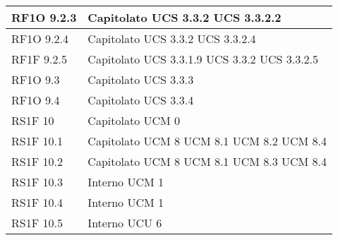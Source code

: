 \begin{center}
\begin{longtable}{ | p{5cm} | p{5cm} |}
        RF1O 9.2.3 &  Capitolato \newline  UCS 3.3.2 \newline  UCS 3.3.2.2 \newline  \\ \hline      
        RF1O 9.2.4 &  Capitolato \newline  UCS 3.3.2 \newline  UCS 3.3.2.4 \newline  \\ \hline      
        RF1F 9.2.5 &  Capitolato \newline  UCS 3.3.1.9 \newline  UCS 3.3.2 \newline  UCS 3.3.2.5 \newline  \\ \hline      
        RF1O 9.3 &  Capitolato \newline  UCS 3.3.3 \newline  \\ \hline      
        RF1O 9.4 &  Capitolato \newline  UCS 3.3.4 \newline  \\ \hline      
        RS1F 10 &  Capitolato \newline  UCM 0 \newline  \\ \hline      
        RS1F 10.1 &  Capitolato \newline  UCM 8 \newline  UCM 8.1 \newline  UCM 8.2 \newline  UCM 8.4 \newline  \\ \hline      
        RS1F 10.2 &  Capitolato \newline  UCM 8 \newline  UCM 8.1 \newline  UCM 8.3 \newline  UCM 8.4 \newline  \\ \hline      
        RS1F 10.3 &  Interno \newline  UCM 1 \newline  \\ \hline      
        RS1F 10.4 &  Interno \newline  UCM 1 \newline  \\ \hline      
        RS1F 10.5 &  Interno \newline  UCU 6 \newline  \\ \hline      

\end{longtable}
\end{center}
